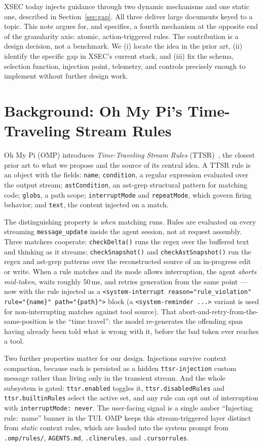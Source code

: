 \documentclass[11pt]{article}
\begin{document}
XSEC today injects guidance through two dynamic mechanisms and one static one,
described in Section~\ref{sec:gap}. All three deliver large documents keyed to a
topic. This note argues for, and specifies, a fourth mechanism at the opposite
end of the granularity axis: atomic, action-triggered rules. The contribution
is a design decision, not a benchmark. We (i) locate the idea in the prior art,
(ii) identify the specific gap in XSEC's current stack, and (iii) fix the schema,
selection function, injection point, telemetry, and controls precisely enough to
implement without further design work.

\section{Background: Oh My Pi's Time-Traveling Stream Rules}
\label{sec:ttsr}

Oh My Pi (OMP) introduces \emph{Time-Traveling Stream Rules}
(TTSR)~\cite{omp,ompttsr,ompwiki}, the closest prior art to what we propose and
the source of its central idea. A TTSR rule is an object with the fields:
\texttt{name}; \texttt{condition}, a regular expression evaluated over the output
stream; \texttt{astCondition}, an ast-grep structural pattern for matching code;
\texttt{globs}, a path scope; \texttt{interruptMode} and \texttt{repeatMode},
which govern firing behavior; and \texttt{text}, the content injected on a match.

The distinguishing property is \emph{when} matching runs. Rules are evaluated on
every streaming \texttt{message\_update} inside the agent session, not at request
assembly. Three matchers cooperate: \texttt{checkDelta()} runs the regex over the
buffered text and thinking as it streams; \texttt{checkSnapshot()} and
\texttt{checkAstSnapshot()} run the regex and ast-grep patterns over the
reconstructed source of an in-progress edit or write. When a rule matches and its
mode allows interruption, the agent \emph{aborts mid-token}, waits roughly
50\,ms, and retries generation from the same point --- now with the rule injected
as a
\texttt{<system-interrupt reason="rule\_violation" rule="\{name\}" path="\{path\}">}
block (a \texttt{<system-reminder ...>} variant is used for non-interrupting
matches against tool source). That abort-and-retry-from-the-same-position is the
``time travel'': the model re-generates the offending span having already been
told what is wrong with it, before the bad token ever reaches a tool.

Two further properties matter for our design. Injections survive context
compaction, because each is persisted as a hidden \texttt{ttsr-injection} custom
message rather than living only in the transient stream. And the whole subsystem
is gated: \texttt{ttsr.enabled} toggles it, \texttt{ttsr.disabledRules} and
\texttt{ttsr.builtinRules} select the active set, and any rule can opt out of
interruption with \texttt{interruptMode: never}. The user-facing signal is a
single amber ``Injecting rule: \guillemotright{}\,name'' banner in the TUI. OMP
keeps this stream-triggered layer distinct from \emph{static} context rules,
which are loaded into the system prompt from \texttt{.omp/rules/},
\texttt{AGENTS.md}, \texttt{.clinerules}, and \texttt{.cursorrules}.
\end{document}
